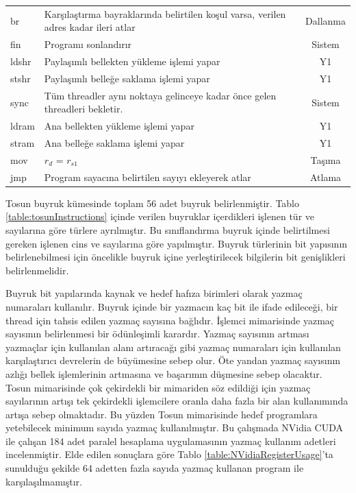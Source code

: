 \begin{longtable}{p{50pt} p{300pt} p{70pt}}
  br 			&	 Karşılaştırma bayraklarında belirtilen koşul varsa, verilen adres kadar ileri atlar & \multicolumn{1}{c}{Dallanma}  \\
  fin 		&	 Programı sonlandırır& \multicolumn{1}{c}{Sistem}  \\
  ldshr 	&	 Paylaşımlı bellekten yükleme işlemi yapar& \multicolumn{1}{c}{Y1}  \\
  stshr 	&	 Paylaşımlı belleğe saklama işlemi yapar& \multicolumn{1}{c}{Y1}  \\
  sync		&	 Tüm threadler aynı noktaya gelinceye kadar önce gelen threadleri bekletir. & \multicolumn{1}{c}{Sistem}  \\
  ldram 	&	 Ana bellekten yükleme işlemi yapar& \multicolumn{1}{c}{Y1}  \\
  stram		&	 Ana belleğe saklama işlemi yapar& \multicolumn{1}{c}{Y1}  \\
  mov 		&  $r_{d}$ = $r_{s1}$ 						&	\multicolumn{1}{c}{Taşıma}		 \\
  jmp  		&  Program sayacına belirtilen sayıyı ekleyerek atlar &	\multicolumn{1}{c}{Atlama}		 \\
  
\end{longtable}

Tosun buyruk kümesinde toplam 56 adet buyruk belirlenmiştir. Tablo \ref{table:tosunInstructions} içinde verilen buyruklar içerdikleri işlenen tür ve sayılarına göre türlere ayrılmıştır. Bu sınıflandırma buyruk içinde belirtilmesi gereken işlenen cins ve sayılarına göre yapılmıştır. Buyruk türlerinin bit yapısının belirlenebilmesi için öncelikle buyruk içine yerleştirilecek bilgilerin bit genişlikleri belirlenmelidir. \par

Buyruk bit yapılarında kaynak ve hedef hafıza birimleri olarak yazmaç numaraları kullanılır. Buyruk içinde bir yazmacın kaç bit ile ifade edileceği, bir thread için tahsis edilen yazmaç sayısına bağlıdır. İşlemci mimarisinde yazmaç sayısının belirlenmesi bir ödünleşimli karardır. Yazmaç sayısının artması yazmaçlar için kullanılan alanı artıracağı gibi yazmaç numaraları için kullanılan karşılaştırıcı devrelerin de büyümesine sebep olur. Öte yandan yazmaç sayısının azlığı bellek işlemlerinin artmasına ve başarımın düşmesine sebep olacaktır. Tosun mimarisinde çok çekirdekli bir mimariden söz edildiği için yazmaç sayılarının artışı tek çekirdekli işlemcilere oranla daha fazla bir alan kullanımında artışa sebep olmaktadır. Bu yüzden Tosun mimarisinde hedef programlara yetebilecek minimum sayıda yazmaç kullanılmıştır. Bu çalışmada NVidia CUDA ile çalışan 184 adet paralel hesaplama uygulamasının yazmaç kullanım adetleri incelenmiştir. Elde edilen sonuçlara göre Tablo \ref{table:NVidiaRegisterUsage}'ta sunulduğu şekilde 64 adetten fazla sayıda yazmaç kullanan program ile karşılaşılmamıştır.

